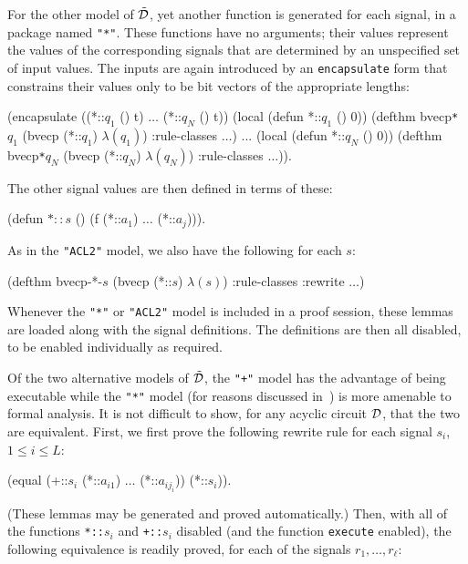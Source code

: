 \documentclass{article}
\begin{document}
For the other model of $\tilde{\cal D}$, yet another function is
generated for each signal, in a package named \verb!"*"!.  These
functions have no arguments; their values represent the values of the
corresponding signals that are determined by an unspecified set of
input values.  The inputs are again introduced by an {\tt encapsulate}
form that constrains their values only to be bit vectors of the
appropriate lengths:\medskip

\begin{acl2}
(encapsulate ((*::$q_1$ () t) $\ldots$ (*::$q_N$ () t))
  (local (defun *::$q_1$ () 0))
  (defthm bvecp\verb!*!$q_1$
     (bvecp (*::$q_1$) $\lambda(q_1)$)
     :rule-classes $\ldots$)
  ...
  (local (defun *::$q_N$ () 0))
  (defthm bvecp\verb!*!$q_N$
     (bvecp (*::$q_N$) $\lambda(q_N)$)
     :rule-classes $\ldots$)).
\end{acl2}\noindent
The other signal values are then defined in terms of these:\medskip

\begin{acl2}
(defun $*::s$ () (f (*::$a_1$) $\ldots$ (*::$a_j$))).
\end{acl2}
\indent As in the \verb!"ACL2"! model, we also have the following for each
$s$:\medskip

\begin{acl2}
(defthm bvecp-*-$s$
  (bvecp (*::$s$) $\lambda(s)$)
  :rule-classes :rewrite $\ldots$)
\end{acl2}\noindent
Whenever the \verb!"*"! or \verb!"ACL2"! model is included in a proof
session, these lemmas are loaded along with the signal
definitions. The definitions are then all disabled, to be enabled
individually as required.

Of the two alternative models of $\tilde{\cal D}$, the \verb!"+"!
model has the advantage of being executable while the \verb!"*"! model
(for reasons discussed in~\cite{mult}) is more amenable to formal
analysis.  It is not difficult to show, for any acyclic circuit ${\cal
D}$, that the two are equivalent.  First, we first prove the following
rewrite rule for each signal $s_i$, $1 \leq i \leq L$:\medskip

\begin{acl2}
(equal (+::$s_i$ (*::$a_{i1}$) $\ldots$ (*::$a_{ij_i}$))
       (*::$s_i$)).
\end{acl2}\noindent
(These lemmas may be generated and proved automatically.)
Then, with all of the functions \verb!*::!$s_i$ and \verb!+::!$s_i$
disabled (and the function {\tt execute} enabled), the following
equivalence is readily proved, for each of the signals
$r_1,\ldots,r_\ell$:\medskip
\end{document}

